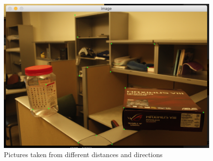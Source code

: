 \documentclass[10pt,twocolumn,letterpaper]{article}
\begin{document}
\begin{figure}[t]
\centering
\includegraphics[width=\columnwidth]{images/pick}

\caption{Pictures taken from different distances and directions}
\label{fig:pick}
\end{figure}
\end{document}
